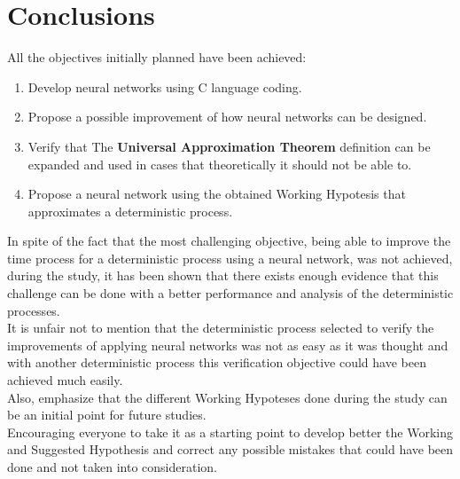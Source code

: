 \documentclass[a4paper, 11pt]{article}
\begin{document}
\newpage
\section{Conclusions}
All the objectives initially planned have been achieved:
\begin{enumerate}
    \item Develop neural networks using C language coding.
    \item Propose a possible improvement of how neural networks can be designed.
    \item Verify that The \textbf{Universal Approximation Theorem} definition can be expanded and used in cases that theoretically it should not be able to.
    \item Propose a neural network using the obtained Working Hypotesis that approximates a deterministic process.
\end{enumerate} 
In spite of the fact that the most challenging objective, being able to improve the time process for a deterministic process using a neural network, was not achieved,
during the study, it has been shown that there exists enough evidence that this challenge can be done with a better performance and analysis of the deterministic processes.\\
It is unfair not to mention that the deterministic process selected to verify the improvements of applying neural networks was not as easy as it was thought and with another deterministic process this verification objective could have been achieved much easily.\\
Also, emphasize that the different Working Hypoteses done during the study can be an initial point for future studies.\\
Encouraging everyone to take it as a starting point to develop better the Working and Suggested Hypothesis and correct any possible mistakes that could have been done and not taken into consideration.\\
\end{document}
